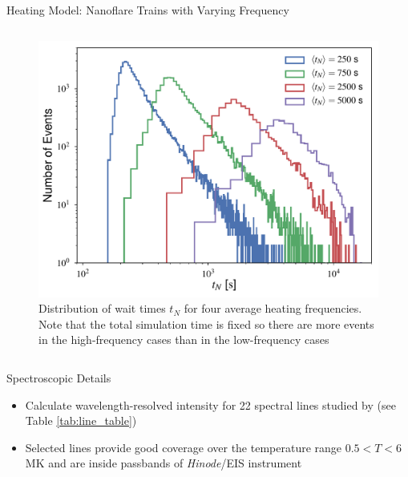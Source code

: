\documentclass[final]{beamer}
\begin{document}
\begin{frame}
\begin{columns}[T]
\begin{column}{0.49\linewidth}
\begin{block}{Heating Model: Nanoflare Trains with Varying Frequency}
\begin{columns}[T]
\begin{column}{0.49\columnwidth}
\begin{figure}
        \includegraphics[width=\columnwidth]{figures/wait_time_distributions.pdf}
        \caption{Distribution of wait times $t_N$ for four average heating frequencies. Note that the total simulation time is fixed so there are more events in the high-frequency cases than in the low-frequency cases} 
        \label{fig:wait_times}
        \end{figure}
      \end{column}
      \end{columns}
    \end{block}
    \begin{block}{Spectroscopic Details}
      \begin{itemize}
        \item Calculate wavelength-resolved intensity for 22 spectral lines studied by \citet{warren_systematic_2012} (see Table \ref{tab:line_table})
        \item Selected lines provide good coverage over the temperature range $0.5<T<6$ MK and are inside passbands of \textit{Hinode}/EIS instrument
      \end{itemize}
      \begin{columns}[T]
        \begin{column}{0.49\columnwidth}
          \begin{figure}

\end{figure}
\end{column}
\end{columns}
\end{block}
\end{column}
\end{columns}
\end{frame}
\end{document}
